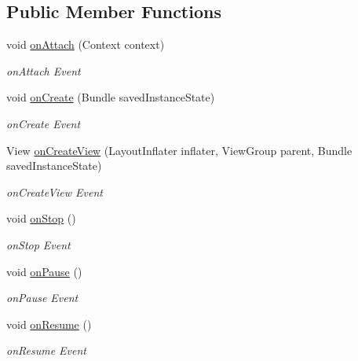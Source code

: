 \subsection*{Public Member Functions}
\begin{DoxyCompactItemize}
\item 
void \hyperlink{classedu_1_1tamu_1_1rfsignalmap_1_1_main_activity_fragment_afa2e497971e51486e7ad03e51e687a24}{on\+Attach} (Context context)
\begin{DoxyCompactList}\small\item\em on\+Attach Event \end{DoxyCompactList}\item 
void \hyperlink{classedu_1_1tamu_1_1rfsignalmap_1_1_main_activity_fragment_a6600a0acb389403f37360350d5a0ddb6}{on\+Create} (Bundle saved\+Instance\+State)
\begin{DoxyCompactList}\small\item\em on\+Create Event \end{DoxyCompactList}\item 
View \hyperlink{classedu_1_1tamu_1_1rfsignalmap_1_1_main_activity_fragment_ac794f6d5686f0644277c3e4e8574e111}{on\+Create\+View} (Layout\+Inflater inflater, View\+Group parent, Bundle saved\+Instance\+State)
\begin{DoxyCompactList}\small\item\em on\+Create\+View Event \end{DoxyCompactList}\item 
void \hyperlink{classedu_1_1tamu_1_1rfsignalmap_1_1_main_activity_fragment_a4205e4271534e663cad10aebf10cd61d}{on\+Stop} ()
\begin{DoxyCompactList}\small\item\em on\+Stop Event \end{DoxyCompactList}\item 
void \hyperlink{classedu_1_1tamu_1_1rfsignalmap_1_1_main_activity_fragment_a7624b00c8e5b8bc595ff3ecca56d3561}{on\+Pause} ()
\begin{DoxyCompactList}\small\item\em on\+Pause Event \end{DoxyCompactList}\item 
void \hyperlink{classedu_1_1tamu_1_1rfsignalmap_1_1_main_activity_fragment_a9341d37b0ffce360a8a403d09d0b2c6b}{on\+Resume} ()
\begin{DoxyCompactList}\small\item\em on\+Resume Event \end{DoxyCompactList}\item 

\end{DoxyCompactItemize}
